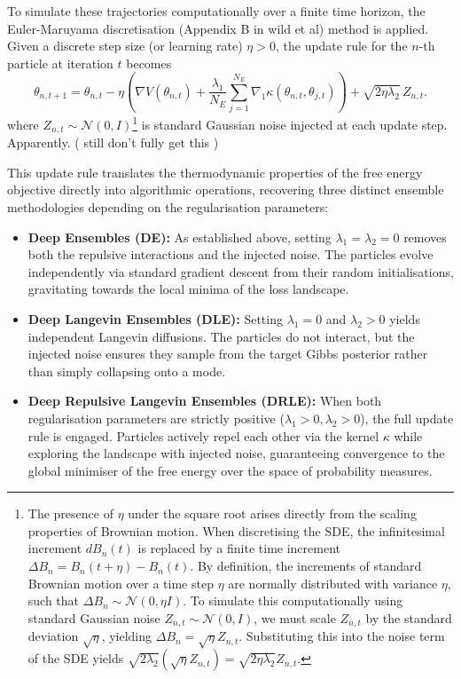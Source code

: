 \documentclass[mstat,12pt]{unswthesis}
\begin{document}
To simulate these trajectories computationally over a finite time horizon, the Euler-Maruyama discretisation (Appendix B in wild et al) method is applied. Given a discrete step size (or learning rate) $\eta > 0$, the update rule for the $n$-th particle at iteration $t$ becomes
\begin{equation}
    \theta_{n, t+1} = \theta_{n, t} - \eta \left( \nabla V(\theta_{n, t}) + \frac{\lambda_1}{N_E} \sum_{j=1}^{N_E} \nabla_1 \kappa(\theta_{n, t}, \theta_{j, t}) \right) + \sqrt{2\eta\lambda_2} \, Z_{n, t}.
    \label{eq:updaterule}
\end{equation}
where $Z_{n, t} \sim \mathcal{N}(0, I)$\footnote{The presence of $\eta$ under the square root arises directly from the scaling properties of Brownian motion. When discretising the SDE, the infinitesimal increment $dB_n(t)$ is replaced by a finite time increment $\Delta B_n = B_n(t+\eta) - B_n(t)$. By definition, the increments of standard Brownian motion over a time step $\eta$ are normally distributed with variance $\eta$, such that $\Delta B_n \sim \mathcal{N}(0, \eta I)$. To simulate this computationally using standard Gaussian noise $Z_{n,t} \sim \mathcal{N}(0, I)$, we must scale $Z_{n,t}$ by the standard deviation $\sqrt{\eta}$, yielding $\Delta B_n = \sqrt{\eta}Z_{n,t}$. Substituting this into the noise term of the SDE yields $\sqrt{2\lambda_2}(\sqrt{\eta}Z_{n,t}) = \sqrt{2\eta\lambda_2}Z_{n,t}$.} is standard Gaussian noise injected at each update step. Apparently. ( still don't fully get this )

This update rule translates the thermodynamic properties of the free energy objective directly into algorithmic operations, recovering three distinct ensemble methodologies depending on the regularisation parameters:
\begin{itemize}
    \item \textbf{Deep Ensembles (DE):} As established above, setting $\lambda_1 = \lambda_2 = 0$ removes both the repulsive interactions and the injected noise. The particles evolve independently via standard gradient descent from their random initialisations, gravitating towards the local minima of the loss landscape.
    \item \textbf{Deep Langevin Ensembles (DLE):} Setting $\lambda_1 = 0$ and $\lambda_2 > 0$ yields independent Langevin diffusions. The particles do not interact, but the injected noise ensures they sample from the target Gibbs posterior rather than simply collapsing onto a mode.
    \item \textbf{Deep Repulsive Langevin Ensembles (DRLE):} When both regularisation parameters are strictly positive ($\lambda_1 > 0, \lambda_2 > 0$), the full update rule is engaged. Particles actively repel each other via the kernel $\kappa$ while exploring the landscape with injected noise, guaranteeing convergence to the global minimiser of the free energy over the space of probability measures.
\end{itemize}
\end{document}
